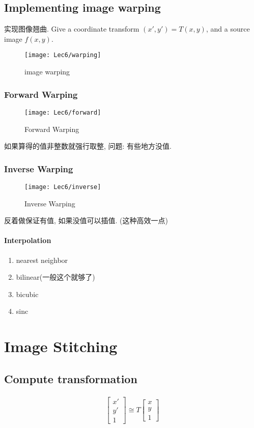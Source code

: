 \subsection{Implementing image warping}
实现图像翘曲. Give a coordinate transform $(x', y')=T(x,y)$, and a source image $f(x,y)$.
\begin{figure}[H]
    \centering
    \texttt{[image: Lec6/warping]}
    \caption{image warping}
\end{figure}

\subsubsection{Forward Warping}
\begin{figure}[H]
    \centering
    \texttt{[image: Lec6/forward]}
    \caption{Forward Warping}
\end{figure}

如果算得的值非整数就强行取整, 问题: 有些地方没值. 

\subsubsection{Inverse Warping}
\begin{figure}[H]
    \centering
    \texttt{[image: Lec6/inverse]}
    \caption{Inverse Warping}
\end{figure}

反着做保证有值, 如果没值可以插值. (这种高效一点)

\paragraph{Interpolation}
\begin{enumerate}
    \item nearest neighbor
    \item bilinear(一般这个就够了)
    \item bicubic
    \item sinc
\end{enumerate}

\section{Image Stitching}

\subsection{Compute transformation}
\begin{align*}
    \begin{bmatrix}
        x'\\y'\\1
    \end{bmatrix}\cong T \begin{bmatrix}
        x\\y\\1
    \end{bmatrix}
\end{align*}

